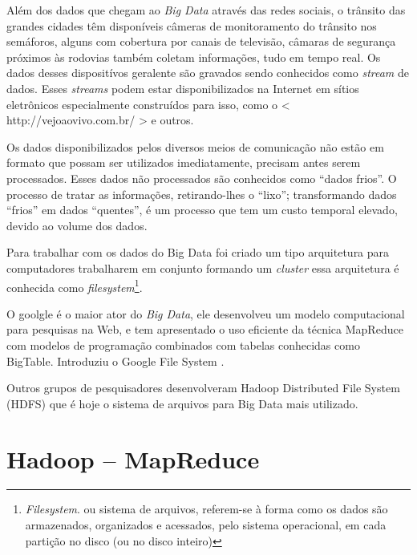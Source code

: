 \documentclass[conference,compsoc]{IEEEtran}
\begin{document}
Além dos dados que chegam ao \textit{Big Data} através das redes sociais, o trânsito das grandes cidades têm disponíveis câmeras de monitoramento do trânsito nos semáforos, alguns com cobertura
por canais de televisão, câmaras de segurança próximos às rodovias também coletam informações, tudo em tempo real. Os dados desses dispositívos geralente são gravados sendo conhecidos como \textit{stream} de dados. 
Esses \textit{streams} podem estar disponibilizados na Internet em sítios eletrônicos especialmente construídos para isso, como o
< http://vejoaovivo.com.br/ > e outros.

Os dados disponibilizados pelos diversos meios de comunicação não estão em formato que possam ser utilizados imediatamente, precisam antes serem processados. Esses dados não processados são conhecidos como ``dados frios''.
O processo de tratar as informações, retirando-lhes o ``lixo''; transformando dados ``frios'' em dados ``quentes'', é um processo que tem um custo temporal elevado, devido ao volume dos dados.

Para trabalhar com os dados do Big Data foi criado um tipo arquitetura para computadores trabalharem em conjunto formando um \textit{cluster} essa arquitetura é conhecida como \textit{filesystem}\footnote{\textit{Filesystem}. ou sistema de arquivos, referem-se à forma como os dados são armazenados, organizados e acessados, pelo sistema operacional, em cada partição no disco (ou no disco inteiro)}.

O goolgle é o maior ator do \textit{Big Data}, ele desenvolveu um modelo computacional para pesquisas na Web, e tem apresentado o uso eficiente da técnica MapReduce com modelos de programação combinados com tabelas conhecidas como BigTable. Introduziu o Google File System \cite{Filesystem}. 

Outros grupos de pesquisadores desenvolveram Hadoop Distributed File System (HDFS) que é hoje o sistema de arquivos para Big Data mais utilizado.\cite{Lange2015}


\section{Hadoop -- MapReduce}
\end{document}
